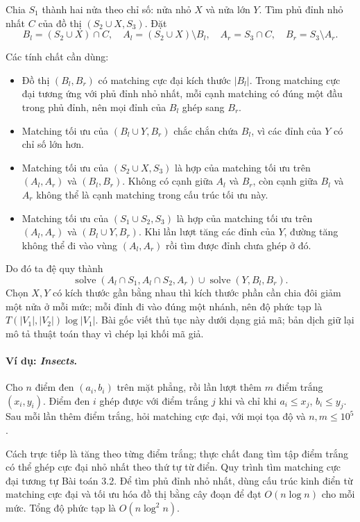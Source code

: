 \documentclass[11pt]{article}
\begin{document}
Chia \(S_1\) thành hai nửa theo chỉ số: nửa nhỏ \(X\) và nửa lớn \(Y\). Tìm phủ
đỉnh nhỏ nhất \(C\) của đồ thị \((S_2\cup X,S_3)\). Đặt
\[
  B_l=(S_2\cup X)\cap C,\quad A_l=(S_2\cup X)\setminus B_l,\quad
  A_r=S_3\cap C,\quad B_r=S_3\setminus A_r.
\]

Các tính chất cần dùng:
\begin{itemize}
  \item Đồ thị \((B_l,B_r)\) có matching cực đại kích thước \(|B_l|\). Trong
  matching cực đại tương ứng với phủ đỉnh nhỏ nhất, mỗi cạnh matching có đúng
  một đầu trong phủ đỉnh, nên mọi đỉnh của \(B_l\) ghép sang \(B_r\).
  \item Matching tối ưu của \((B_l\cup Y,B_r)\) chắc chắn chứa \(B_l\), vì các
  đỉnh của \(Y\) có chỉ số lớn hơn.
  \item Matching tối ưu của \((S_2\cup X,S_3)\) là hợp của matching tối ưu trên
  \((A_l,A_r)\) và \((B_l,B_r)\). Không có cạnh giữa \(A_l\) và \(B_r\), còn
  cạnh giữa \(B_l\) và \(A_r\) không thể là cạnh matching trong cấu trúc tối ưu
  này.
  \item Matching tối ưu của \((S_1\cup S_2,S_3)\) là hợp của matching tối ưu
  trên \((A_l,A_r)\) và \((B_l\cup Y,B_r)\). Khi lần lượt tăng các đỉnh của
  \(Y\), đường tăng không thể đi vào vùng \((A_l,A_r)\) rồi tìm được đỉnh chưa
  ghép ở đó.
\end{itemize}

Do đó ta đệ quy thành
\[
  \operatorname{solve}(A_l\cap S_1,A_l\cap S_2,A_r)
  \cup
  \operatorname{solve}(Y,B_l,B_r).
\]
Chọn \(X,Y\) có kích thước gần bằng nhau thì kích thước phần cần chia đôi giảm
một nửa ở mỗi mức; mỗi đỉnh đi vào đúng một nhánh, nên độ phức tạp là
\(T(|V_1|,|V_2|)\log |V_1|\). Bài gốc viết thủ tục này dưới dạng giả mã; bản
dịch giữ lại mô tả thuật toán thay vì chép lại khối mã giả.

\paragraph{Ví dụ: \emph{Insects}.}
Cho \(n\) điểm đen \((a_i,b_i)\) trên mặt phẳng, rồi lần lượt thêm \(m\) điểm
trắng \((x_i,y_i)\). Điểm đen \(i\) ghép được với điểm trắng \(j\) khi và chỉ
khi \(a_i\le x_j\), \(b_i\le y_j\). Sau mỗi lần thêm điểm trắng, hỏi matching
cực đại, với mọi tọa độ và \(n,m\le 10^5\).

Cách trực tiếp là tăng theo từng điểm trắng; thực chất đang tìm tập điểm trắng
có thể ghép cực đại nhỏ nhất theo thứ tự từ điển. Quy trình tìm matching cực
đại tương tự Bài toán 3.2. Để tìm phủ đỉnh nhỏ nhất, dùng cấu trúc kinh điển từ
matching cực đại và tối ưu hóa đồ thị bằng cây đoạn để đạt \(O(n\log n)\) cho
mỗi mức. Tổng độ phức tạp là \(O(n\log^2 n)\).
\end{document}
